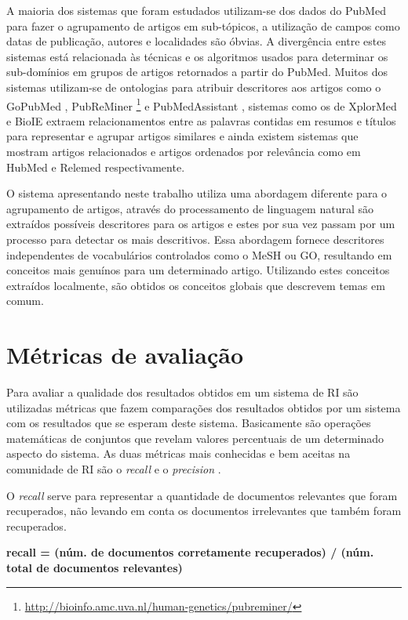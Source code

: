 A maioria dos sistemas que foram estudados utilizam-se dos dados do PubMed para fazer o agrupamento de artigos em sub-tópicos, a utilização de campos como datas de publicação, autores e localidades são óbvias. A divergência entre estes sistemas está relacionada às técnicas e os algoritmos usados para determinar os sub-domínios em grupos de artigos retornados a partir do PubMed. Muitos dos sistemas utilizam-se de ontologias para atribuir descritores aos artigos como o GoPubMed \cite{Doms2005}, PubReMiner \footnote{\href{http://bioinfo.amc.uva.nl/human-genetics/pubreminer/}{http://bioinfo.amc.uva.nl/human-genetics/pubreminer/}} e PubMedAssistant \cite{Ding2006}, sistemas como os de  XplorMed \cite{Perez-Iratxeta2001} e BioIE \cite{Divoli2005} extraem relacionamentos entre as palavras contidas em resumos e títulos para representar e agrupar artigos similares e ainda existem sistemas que mostram artigos relacionados e artigos ordenados por relevância como em HubMed \cite{Eaton2006} e Relemed \cite{Siadaty2007} respectivamente.

O sistema apresentando neste trabalho utiliza uma abordagem diferente para o agrupamento de artigos, através do processamento de linguagem natural são extraídos possíveis descritores para os artigos e estes por sua vez passam por um processo para detectar os mais descritivos. Essa abordagem fornece descritores independentes de vocabulários controlados como o MeSH ou GO, resultando em conceitos mais genuínos para um determinado artigo. Utilizando estes conceitos extraídos localmente, são obtidos os conceitos globais que descrevem temas em comum.

\section{Métricas de avaliação}
Para avaliar a qualidade dos resultados obtidos em um sistema de RI são utilizadas métricas que fazem comparações dos resultados obtidos por um sistema com os resultados que se esperam deste sistema. Basicamente são operações matemáticas de conjuntos que revelam valores percentuais de um determinado aspecto do sistema. As duas métricas mais conhecidas e bem aceitas na comunidade de RI são o \emph{recall} e o \emph{precision} \cite{Turpin2006}.

O \emph{recall} serve para representar a quantidade de documentos relevantes que foram recuperados, não levando em conta os documentos irrelevantes que também foram recuperados.
\\
\begin{center}
\textbf{
recall = (núm. de documentos corretamente recuperados) / (núm. total de documentos relevantes)
}
\end{center}

